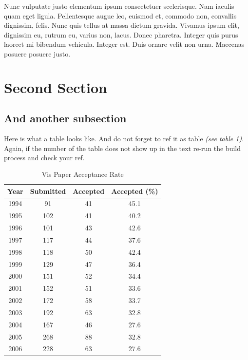 \documentclass[journal]{vgtc}                %
\begin{document}
Nunc vulputate justo elementum ipsum consectetuer scelerisque. Nam iaculis quam eget ligula. Pellentesque augue leo, euismod et, commodo non, convallis dignissim, felis. Nunc quis tellus at massa dictum gravida. Vivamus ipsum elit, dignissim eu, rutrum eu, varius non, lacus. Donec pharetra. Integer quis purus laoreet mi bibendum vehicula. Integer est. Duis ornare velit non urna. Maecenas posuere posuere justo. 

\section{Second Section}

\subsection{And another subsection}

Here is what a table looks like. And do not forget to ref it as table \textit{(see table \ref{tab:vis_accept})}.
Again, if the number of the table does not show up in the text re-run the build process and check your ref.


\begin{table}
  \caption{Vis Paper Acceptance Rate}
  \label{tab:vis_accept}
  \scriptsize
  \begin{center}
    \begin{tabular}{cccc}
      Year & Submitted & Accepted & Accepted (\%)\\
    \hline
      1994 &  91 & 41 & 45.1\\
      1995 & 102 & 41 & 40.2\\
      1996 & 101 & 43 & 42.6\\
      1997 & 117 & 44 & 37.6\\
      1998 & 118 & 50 & 42.4\\
      1999 & 129 & 47 & 36.4\\
      2000 & 151 & 52 & 34.4\\
      2001 & 152 & 51 & 33.6\\
      2002 & 172 & 58 & 33.7\\
      2003 & 192 & 63 & 32.8\\
      2004 & 167 & 46 & 27.6\\
      2005 & 268 & 88 & 32.8\\
      2006 & 228 & 63 & 27.6
    \end{tabular}
  \end{center}
\end{table}
\end{document}
